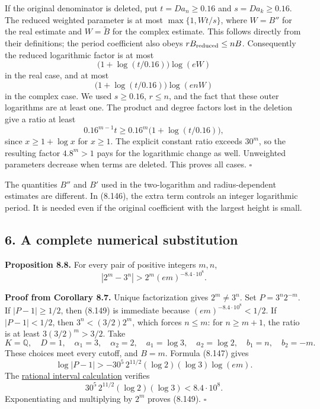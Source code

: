 \documentclass[
  11pt,
  a4paper,
]{article}
\begin{document}
If the original denominator is deleted, put \(t=D a_n\ge0.16\) and
\(s=D a_k\ge0.16\). The reduced weighted parameter is at most
\(\max\{1,Wt/s\}\), where \(W=B''\) for the real estimate and
\(W=\widetilde B\) for the complex estimate. This follows directly from
their definitions; the period coefficient also obeys
\(rB_{\rm reduced}\le nB\). Consequently the reduced logarithmic factor
is at most \[
\bigl(1+\log(t/0.16)\bigr)\log(eW)
\] in the real case, and at most \[
\bigl(1+\log(t/0.16)\bigr)\log(enW)
\] in the complex case. We used \(s\ge0.16\), \(r\le n\), and the fact
that these outer logarithms are at least one. The product and degree
factors lost in the deletion give a ratio at least \[
0.16^{m-1}t
\ge0.16^m\bigl(1+\log(t/0.16)\bigr),
\] since \(x\ge1+\log x\) for \(x\ge1\). The explicit constant ratio
exceeds \(30^m\), so the resulting factor \(4.8^m>1\) pays for the
logarithmic change as well. Unweighted parameters decrease when terms
are deleted. This proves all cases. \(\square\)

The quantities \(B''\) and \(B'\) used in the two-logarithm and
radius-dependent estimates are different. In (8.146), the extra term
controls an integer logarithmic period. It is needed even if the
original coefficient with the largest height is small.

\subsection{6. A complete numerical
substitution}\label{a-complete-numerical-substitution}

\textbf{Proposition 8.8.} For every pair of positive integers \(m,n\),
\[
|2^m-3^n|>2^m(em)^{-8.4\cdot10^8}. \tag{8.149}
\]

\textbf{Proof from Corollary 8.7.} Unique factorization gives
\(2^m\ne3^n\). Set \(P=3^n2^{-m}\). If \(|P-1|\ge1/2\), then (8.149) is
immediate because \((em)^{-8.4\cdot10^8}<1/2\). If \(|P-1|<1/2\), then
\(3^n<(3/2)2^m\), which forces \(n\le m\): for \(n\ge m+1\), the ratio
is at least \(3(3/2)^m>3/2\). Take \[
K=\mathbb Q,\quad D=1,\quad
\alpha_1=3,\quad\alpha_2=2,\quad
a_1=\log3,\quad a_2=\log2,\quad
b_1=n,\quad b_2=-m.
\] These choices meet every cutoff, and \(B=m\). Formula (8.147) gives
\[
\log|P-1|>
-30^5\,2^{11/2}(\log2)(\log3)\log(em).
\] The \href{https://kokunoyumeto.github.io/open-math-courses-public/courses/TR-BAKER/verification/many_logarithm_constants.py}{rational
interval calculation} verifies \[
30^5\,2^{11/2}(\log2)(\log3)<8.4\cdot10^8.
\] Exponentiating and multiplying by \(2^m\) proves (8.149). \(\square\)
\end{document}
